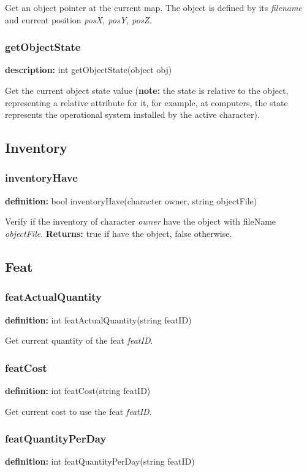\documentclass[ letterpaper,12pt]{article}
\begin{document}
Get an object pointer at the current map. The object is defined by its {\it
filename} and current position {\it posX, posY, posZ}.

\subsubsection{getObjectState}
{\bf description:} int getObjectState(object obj)

Get the current object state value ({\bf note:} the state is relative to the
object, representing a relative attribute for it, for example, at computers, the
state represents the operational system installed by the active character).

\subsection{Inventory}

\subsubsection{inventoryHave}
{\bf definition:} bool inventoryHave(character owner, string objectFile)

Verify if the inventory of character {\it owner} have the object with fileName
{\it objectFile}. {\bf Returns: } true if have the object, false otherwise.

\subsection{Feat}

\subsubsection{featActualQuantity}
{\bf definition:} int featActualQuantity(string featID)

Get current quantity of the feat {\it featID}.

\subsubsection{featCost}
{\bf definition:} int featCost(string featID)

Get current cost to use the feat {\it featID}.

\subsubsection{featQuantityPerDay}
{\bf definition:} int featQuantityPerDay(string featID)
\end{document}
